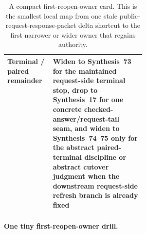 \documentclass[11pt]{article}
\begin{document}
\begin{table}[t]
\begin{tabularx}{0.98\linewidth}{@{}p{0.33\linewidth}X@{}}
Terminal / paired remainder & Widen to \textbf{Synthesis~73} for the maintained request-side terminal stop, drop to \textbf{Synthesis~17} for one concrete checked-answer/request-tail seam, and widen to \textbf{Synthesis~74--75} only for the abstract paired-terminal discipline or abstract cutover judgment when the downstream request-side refresh branch is already fixed \\
\bottomrule
\end{tabularx}
\caption{A compact first-reopen-owner card. This is the smallest local map from one stale public-request-response-packet delta shortcut to the first narrower or wider owner that regains authority.}
\label{tab:first-reopen-owner-card-public-request-response-packet-deltas}
\end{table}

\paragraph{One tiny first-reopen-owner drill.}
\end{document}

